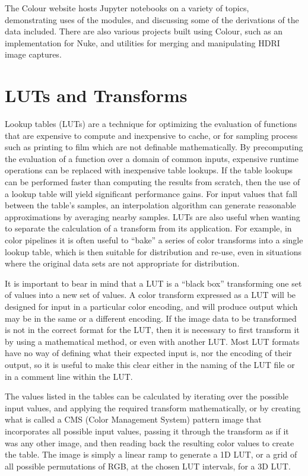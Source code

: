 The Colour website hosts Jupyter notebooks on a variety of topics, demonstrating uses of the modules, and discussing some of the derivations of the data included. There are also various projects built using Colour, such as an implementation for Nuke, and utilities for merging and manipulating HDRI image captures.

\section{LUTs and Transforms}

Lookup tables (LUTs) are a technique for optimizing the evaluation of functions that are expensive to compute and inexpensive to cache, or for sampling process such as printing to film which are not definable mathematically. By precomputing the evaluation of a function over a domain of common inputs, expensive runtime operations can be replaced with inexpensive table lookups. If the table lookups can be performed faster than computing the results from scratch, then the use of a lookup table will yield significant performance gains. For input values that fall between the table's samples, an interpolation algorithm can generate reasonable approximations by averaging nearby samples. LUTs are also useful when wanting to separate the calculation of a transform from its application. For example, in color pipelines it is often useful to “bake” a series of color transforms into a single lookup table, which is then suitable for distribution and re-use, even in situations where the original data sets are not appropriate for distribution.

It is important to bear in mind that a LUT is a “black box” transforming one set of values into a new set of values. A color transform expressed as a LUT will be designed for input in a particular color encoding, and will produce output which may be in the same or a different encoding. If the image data to be transformed is not in the correct format for the LUT, then it is necessary to first transform it by using a mathematical method, or even with another LUT. Most LUT formats have no way of defining what their expected input is, nor the encoding of their output, so it is useful to make this clear either in the naming of the LUT file or in a comment line within the LUT.

The values listed in the tables can be calculated by iterating over the possible input values, and applying the required transform mathematically, or by creating what is called a CMS (Color Management System) pattern image that incorporates all possible input values, passing it through the transform as if it was any other image, and then reading back the resulting color values to create the table. The image is simply a linear ramp to generate a 1D LUT, or a grid of all possible permutations of RGB, at the chosen LUT intervals, for a 3D LUT.

